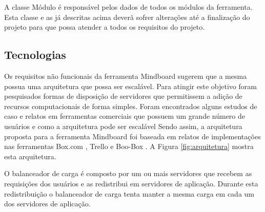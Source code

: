 A classe Módulo é responsável pelos dados de todos os módulos da ferramenta. Esta classe e as já descritas acima deverã sofrer alterações até a finalização do projeto para que possa atender a todos os requisitos do projeto. 

\subsection{Tecnologias}
\label{sec:tecnologias}

Os requisitos não funcionais da ferramenta Mindboard sugerem que a mesma possua uma arquitetura que possa ser escalável. Para atingir este objetivo foram pesquisados formas de disposição de servidores que permitissem a adição de recursos computacionais de forma simples. Foram encontrados alguns estudos de caso e relatos em ferramentas comerciais que possuem um grande número de usuários e como a arquitetura pode ser escalável Sendo assim, a arquitetura proposta para a ferramenta Mindboard foi baseada em relatos de implementações nas ferramentas Box.com \cite{boxcom}, Trello \cite{trello} e Boo-Box \cite{boobox}. A Figura \ref{fig:arquitetura} mostra esta arquitetura.


O balanceador de carga é composto por um ou mais servidores que recebem as requisições dos usuários e as redistribui em servidores de aplicação. Durante esta redistribuição o balanceador de carga tenta manter a mesma carga em cada um dos servidores de aplicação.

